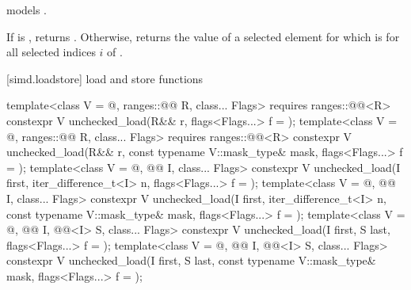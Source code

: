\begin{itemdescr}
\pnum
\constraints
{} models .

\pnum
\returns
If  is , returns
.
Otherwise, returns the value of a selected element  for which
 is  for all selected indices $i$ of
.
\end{itemdescr}

[simd.loadstore]{ load and store functions}

\begin{itemdecl}
template<class V = @\seebelow@, ranges::@@ R, class... Flags>
  requires ranges::@@<R>
  constexpr V unchecked_load(R&& r, flags<Flags...> f = {});
template<class V = @\seebelow@, ranges::@@ R, class... Flags>
  requires ranges::@@<R>
  constexpr V unchecked_load(R&& r, const typename V::mask_type& mask, flags<Flags...> f = {});
template<class V = @\seebelow@, @@ I, class... Flags>
  constexpr V unchecked_load(I first, iter_difference_t<I> n, flags<Flags...> f = {});
template<class V = @\seebelow@, @@ I, class... Flags>
  constexpr V unchecked_load(I first, iter_difference_t<I> n, const typename V::mask_type& mask,
                             flags<Flags...> f = {});
template<class V = @\seebelow@, @@ I, @@<I> S, class... Flags>
  constexpr V unchecked_load(I first, S last, flags<Flags...> f = {});
template<class V = @\seebelow@, @@ I, @@<I> S, class... Flags>
  constexpr V unchecked_load(I first, S last, const typename V::mask_type& mask,
                             flags<Flags...> f = {});
\end{itemdecl}

